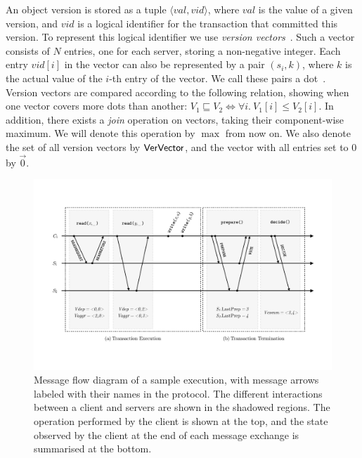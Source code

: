 An object version is stored as a tuple $\langle val, vid \rangle$, where $val$ is the value of a given version, and $vid$ is a logical identifier for the transaction that committed this version. To represent this logical identifier we use \emph{version vectors}~\citep{version-vectors}. Such a vector consists of $N$ entries, one for each server, storing a non-negative integer. Each entry $vid[i]$ in the vector can also be represented by a pair $(s_i, k)$, where $k$ is the actual value of the $i$-th entry of the vector. We call these pairs a dot~\citep{carlos-causality}. Version vectors are compared according to the following relation, showing when one vector covers more dots than another: $V_1 \sqsubseteq V_2 \iff \forall i.\ V_1[i] \le V_2[i]$. In addition, there exists a \emph{join} operation on vectors, taking their component-wise maximum. We will denote this operation by $\max$ from now on. We also denote the set of all version vectors by $\mathsf{VerVector}$, and the vector with all entries set to $0$ by $\vec{0}$.

\begin{figure}[t]
\vspace{-2cm}
\includegraphics[width=\textwidth]{figures/ch4_execution.pdf}
\vspace{-2cm}
\caption{Message flow diagram of a sample execution, with message arrows labeled with their names in the protocol. The different interactions between a client and servers are shown in the shadowed regions. The operation performed by the client is shown at the top, and the state observed by the client at the end of each message exchange is summarised at the bottom.}
\label{fig:execution}
\end{figure}

